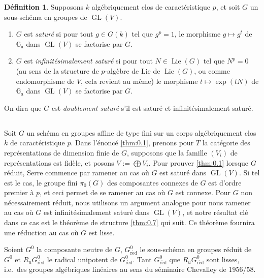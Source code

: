 \documentclass[11pt,a4paper]{article}
\theoremstyle{plain}
\theoremstyle{definition}
\newtheorem{definition}[theorem]{D\'efinition}
\DeclareMathOperator{\Lie}{Lie}
\DeclareMathOperator{\GL}{GL}
\newcommand{\Ga}{\mathbb{G}_\mathrm{a}}
\newcommand{\red}{\mathrm{r\acute{e}d}}
\begin{document}
\begin{definition}\label{def:0.5}
Supposons $k$ alg\'ebriquement clos de caract\'eristique $p$, et soit $G$ un sous-sch\'ema en groupes de $\GL(V)$.
\begin{enumerate}[label=(\roman*)]
\item $G$ est \emph{satur\'e} si pour tout $g \in G(k)$ tel que $g^p = 1$, le morphisme $g \mapsto g^t$ de $\Ga$ dans $\GL(V)$ se factorise par $G$.
\item $G$ est \emph{infinit\'esimalement satur\'e} si pour tout $N \in \Lie(G)$ tel que $N^p = 0$ (au sens de la structure de $p$-alg\`ebre de Lie de $\Lie(G)$, ou comme endomorphisme de $V$, cela revient au m\^eme) le morphisme $t \mapsto \exp(tN)$ de $\Ga$ dans $\GL(V)$ se factorise par $G$.
\end{enumerate}
On dira que $G$ est \emph{doublement satur\'e} s'il est satur\'e et infinit\'esimalement satur\'e.
\end{definition}

\subsection{}
Soit $G$ un sch\'ema en groupes affine de type fini sur un corps alg\'ebriquement clos $k$ de caract\'eristique $p$. Dans l'\'enonc\'e \ref{thm:0.1}, prenons pour $T$ la cat\'egorie des repr\'esentations de dimension finie de $G$, supposons que la famille $(V_i)$ de repr\'esentations est fid\`ele, et posons $V := \bigoplus V_i$. Pour prouver \ref{thm:0.1} lorsque $G$ r\'eduit, Serre \cite{Serre1994} commence par ramener au cas o\`u $G$ est satur\'e dans $\GL(V)$. Si tel est le cas, le groupe fini $\pi_0(G)$ des composantes connexes de $G$ est d'ordre premier \`a $p$, et ceci permet de se ramener au cas o\`u $G$ est connexe. Pour $G$ non n\'ecessairement r\'eduit, nous utilisons un argument analogue pour nous ramener au cas o\`u $G$ est infinit\'esimalement satur\'e dans $\GL(V)$, et notre r\'esultat cl\'e dans ce cas est le th\'eor\`eme de structure \ref{thm:0.7} qui suit. Ce th\'eor\`eme fournira une r\'eduction au cas o\`u $G$ est lisse.

Soient $G^0$ la composante neutre de $G$, $G^0_\red$ le sous-sch\'ema en groupes r\'eduit de $G^0$ et $R_u G^0_\red$ le radical unipotent de $G^0_\red$. Tant $G^0_\red$ que $R_u G^0_\red$ sont lisses, i.e.\ des groupes alg\'ebriques lin\'eaires au sens du s\'eminaire Chevalley de 1956/58.
\end{document}
